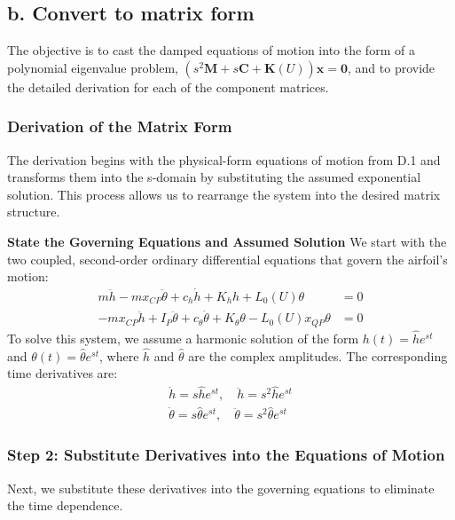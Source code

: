 \documentclass{article}
\begin{document}
\subsection{b. Convert to matrix form}
The objective is to cast the damped equations of motion into the form of a polynomial eigenvalue problem, $(s^2\mathbf{M} + s\mathbf{C} + \mathbf{K}(U))\mathbf{x} = \mathbf{0}$, and to provide the detailed derivation for each of the component matrices.

\subsubsection{Derivation of the Matrix Form}
The derivation begins with the physical-form equations of motion from D.1 and transforms them into the s-domain by substituting the assumed exponential solution. This process allows us to rearrange the system into the desired matrix structure.

\textbf{State the Governing Equations and Assumed Solution}
We start with the two coupled, second-order ordinary differential equations that govern the airfoil's motion:
\begin{align}
    m\ddot{h} - mx_{CP}\ddot{\theta} + c_h\dot{h} + K_h h + L_0(U)\theta &= 0 \label{eq:d2_full_plunge} \\
    -mx_{CP}\ddot{h} + I_P\ddot{\theta} + c_\theta\dot{\theta} + K_\theta\theta - L_0(U)x_{QP}\theta &= 0 \label{eq:d2_full_pitch}
\end{align}
To solve this system, we assume a harmonic solution of the form $h(t) = \hat{h}e^{st}$ and $\theta(t) = \hat{\theta}e^{st}$, where $\hat{h}$ and $\hat{\theta}$ are the complex amplitudes. The corresponding time derivatives are:
\begin{align*}
    \dot{h} = s\hat{h}e^{st}, \quad \ddot{h} = s^2\hat{h}e^{st} \\
    \dot{\theta} = s\hat{\theta}e^{st}, \quad \ddot{\theta} = s^2\hat{\theta}e^{st}
\end{align*}

\subsubsection{Step 2: Substitute Derivatives into the Equations of Motion}
Next, we substitute these derivatives into the governing equations to eliminate the time dependence.
\end{document}
